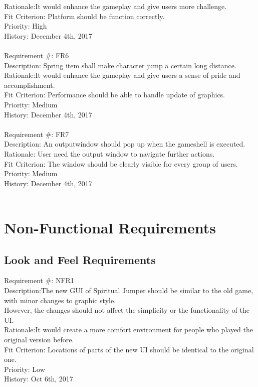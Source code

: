 \documentclass[12pt, titlepage]{article}
\begin{document}
{Rationale:It would enhance the gameplay and give users more challenge.\\
Fit Criterion: Platform should be function correctly.\\
Priority: High\\
History: December 4th, 2017\\\\
Requirement \#: FR6\\
Description: Spring item shall make character jump a certain long distance.\\
Rationale:It would enhance the gameplay and give users a sense of pride and accomplishment.\\
Fit Criterion: Performance should be able to handle update of graphics.\\
Priority: Medium\\
History: December 4th, 2017\\\\
Requirement \#: FR7\\
Description: An outputwindow should pop up when the gameshell is executed.\\
Rationale: User need the output window to navigate further actions.\\
Fit Criterion: The window should be clearly visible for every group of users.\\
Priority: Medium\\
History: December 4th, 2017}\\\\

\section{Non-Functional Requirements}

\subsection{Look and Feel Requirements}
Requirement \#: NFR1\\
Description:The new GUI of Spiritual Jumper should be similar to the old game, with minor changes to graphic style.\\ However, the changes should not affect the simplicity or the functionality of the UI.\\
Rationale:It would create a more comfort environment for people who played the original version before.\\
Fit Criterion: Locations of parts of the new UI should be identical to the original one.\\
Priority: Low\\
History: Oct 6th, 2017\\
\end{document}
